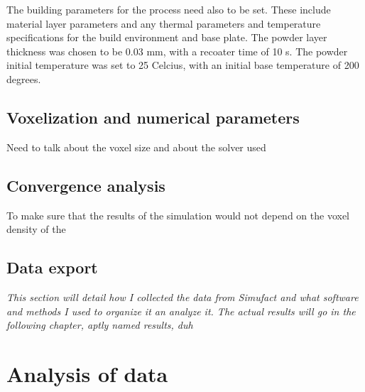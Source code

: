 \documentclass[../main.tex]{subfiles}
\begin{document}
The building parameters for the process need also to be set. These include material layer parameters and any thermal parameters and temperature specifications for the build environment and base plate. The powder layer thickness was chosen to be 0.03 mm, with a recoater time of 10 s. The powder initial temperature was set to 25 \degree Celcius, with an initial base temperature of 200 degrees. 




\subsection{Voxelization and numerical parameters}

Need to talk about the voxel size and about the solver used

\subsection{Convergence analysis}

To make sure that the results of the simulation would not depend on the voxel density of the 

\subsection{Data export}

\textit{This section will detail how I collected the data from Simufact and what software and methods I used to organize it an analyze it. The actual results will go in the following chapter, aptly named results, duh}

\section{Analysis of data}



\listoftodos
\end{document}
